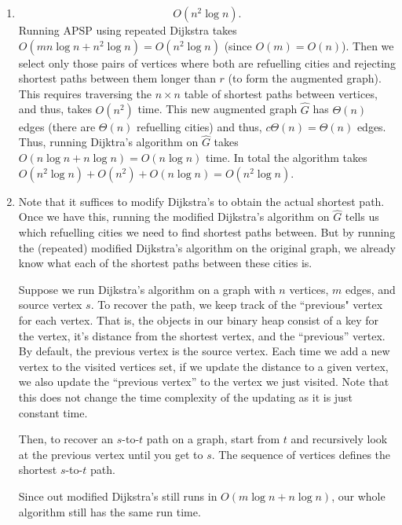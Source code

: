 \documentclass[12 pt, letterpaper]{hmcpset}
\begin{document}
\begin{solution}
\begin{enumerate}
			That is,
			\begin{align*}
				\ell(P) & \ge \sum_{v_{i} \in \hat{P}} \ell(v_{i}, v_{i + 1}) \\
					& = \ell(\hat{P}) \\
					& \ge \ell(\hat{Q}) \\
					& = \ell(Q).
			\end{align*}
			Since $\ell(P) \ge \ell(Q)$, $Q$ is the minimal length path with distance no greater than $r$ between consecutive refuelling cities.

		\item 
			\[
				\boxed{
					O(n^{2} \log n).
				}
			\]
			Running APSP using repeated Dijkstra takes $O(mn \log n + n^{2} \log n) = O(n^{2} \log n)$ (since $O(m) = O(n)$). Then we select only those pairs of vertices where both are refuelling cities and rejecting shortest paths between them longer than $r$ (to form the augmented graph). This requires traversing the $n \times n$ table of shortest paths between vertices, and thus, takes $O(n^{2})$ time. This new augmented graph $\hat{G}$ has $\Theta(n)$ edges (there are $\Theta(n)$ refuelling cities) and thus, $c \Theta(n) = \Theta(n)$ edges. Thus, running Dijktra's algorithm on $\hat{G}$ takes $O(n \log n + n \log n) = O(n \log n)$ time. In total the algorithm takes $O(n^{2} \log n) + O(n^{2}) + O(n \log n) = O(n^{2} \log n)$.

		\item Note that it suffices to modify Dijkstra's to obtain the actual shortest path. Once we have this, running the modified Dijkstra's algorithm on $\hat{G}$ tells us which refuelling cities we need to find shortest paths between. But by running the (repeated) modified Dijkstra's algorithm on the original graph, we already know what each of the shortest paths between these cities is.

			Suppose we run Dijkstra's algorithm on a graph with $n$ vertices, $m$ edges, and source vertex $s$. To recover the path, we keep track of the ``previous" vertex for each vertex. That is, the objects in our binary heap consist of a key for the vertex, it's distance from the shortest vertex, and the ``previous'' vertex. By default, the previous vertex is the source vertex. Each time we add a new vertex to the visited vertices set, if we update the distance to a given vertex, we also update the ``previous vertex'' to the vertex we just visited. Note that this does not change the time complexity of the updating as it is just constant time.

			Then, to recover an $s$-to-$t$ path on a graph, start from $t$ and recursively look at the previous vertex until you get to $s$. The sequence of vertices defines the shortest $s$-to-$t$ path.

			Since out modified Dijkstra's still runs in $O(m \log n + n \log n)$, our whole algorithm still has the same run time.
	\end{enumerate}
\end{solution}
\end{document}
